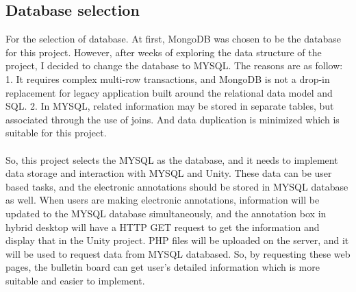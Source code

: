\subsection{Database selection}
For the selection of database. At first, MongoDB was chosen to be the database for this project. However, after weeks of exploring the data structure of the project, I decided to change the database to MYSQL. The reasons are as follow: 1. It requires complex multi-row transactions, and MongoDB is not a drop-in replacement for legacy application built around the relational data model and SQL. 2. In MYSQL, related information may be stored in separate tables, but associated through the use of joins. And data duplication is minimized which is suitable for this project. 
\\
\\
So, this project selects the MYSQL as the database, and it needs to implement data storage and interaction with MYSQL and Unity. These data can be user based tasks, and the electronic annotations should be stored in MYSQL database as well. When users are making electronic annotations, information will be updated to the MYSQL database simultaneously, and the annotation box in hybrid desktop will have a HTTP GET request to get the information and display that in the Unity project.
PHP files will be uploaded on the server, and it will be used to request data from MYSQL databased. So, by requesting these web pages, the bulletin board can get user’s detailed information which is more suitable and easier to implement.

